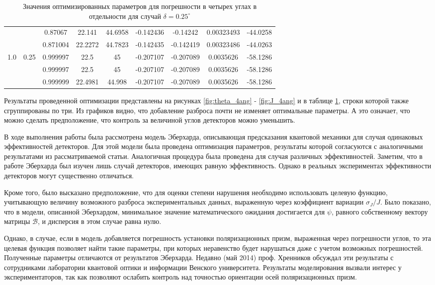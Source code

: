 \documentclass[%
master,         %
subf,           %
href,           %
,times         %
]{disser}
\numberwithin{equation}{section}
\numberwithin{figure}{section}
\begin{document}
\begin{table}
\begin{tabular}{|c|c|c|c|c|c|c|c|c|}
 &  & 0.87067 & 22.141 & 44.6958 & -0.142436 & -0.14242 & 0.00323493 & -44.0258\\\cline{3-9}
 &  & 0.871004 & 22.2272 & 44.7823 & -0.142435 & -0.142419 & 0.00323486 & -44.0263\\\hline
\multirow{3}{*}{1.0} & \multirow{3}{*}{0.25} & 0.999997 & 22.5 & 45 & -0.207107 & -0.207089 & 0.0035626 & -58.1286\\\cline{3-9}
 &  & 0.999997 & 22.5 & 45 & -0.207107 & -0.207089 & 0.0035626 & -58.1286\\\cline{3-9}
 &  & 0.999999 & 22.4981 & 44.998 & -0.207107 & -0.207089 & 0.0035626 & -58.1286\\\hline
 \end{tabular}
\caption{Значения оптимизированных параметров для погрешности в четырех углах в отдельности для случай $\delta = 0.25^\circ$}
\label{tab:different_deltas}
\end{table}


Результаты проведенной оптимизации представлены на рисунках \ref{fig:theta_4ang} - \ref{fig:J_4ang} и в таблице \ref{tab:different_deltas}, строки которой также сгруппированы по три. Из графиков видно, что добавление разброса почти не изменяет оптимальные параметры. А это означает, что можно сделать предположение, что контроль за величиной углов детекторов можно уменьшить. 

\conclusion
В ходе выполнения работы была рассмотрена модель Эберхарда, описывающая предсказания квантовой механики для случая одинаковых эффективностей детекторов. Для этой модели была проведена оптимизация параметров, результаты которой согласуются с аналогичными результатами из рассматриваемой статьи. Аналогичная процедура была проведена для случая различных эффективностей. Заметим, что в работе Эберхарда был изучен лишь случай детекторов, имеющих равную эффективность. Однако в реальных экспериментах эффективности детекторов могут существенно отличаться.

Кроме того, было высказано предположение, что для оценки степени нарушения необходимо использовать целевую функцию, учитывающую величину возможного разброса экспериментальных данных, выраженную через коэффициент вариации $\sigma_J / J$. Было показано, что в модели, описанной Эберхардом, минимальное значение математического ожидания достигается для $\psi$, равного собственному вектору матрицы $\mathcal{B}$, и дисперсия в этом случае равна нулю.

Однако, в случае, если в модель добавляется погрешность установки поляризационных призм, выраженная через погрешности углов, то эта целевая функция позволяет найти такие параметры, при которых неравенство будет нарушаться даже с учетом возможных погрешностей. Полученные параметры отличаются от результатов Эберхарда. Недавно (май 2014) проф. Хренников  обсуждал эти результаты с сотрудниками лаборатории квантовой оптики и информации Венского университета. Результаты моделирования вызвали интерес у экспериментаторов, так как позволяют ослабить контроль над точностью ориентации осей поляризационных призм.
\end{document}
